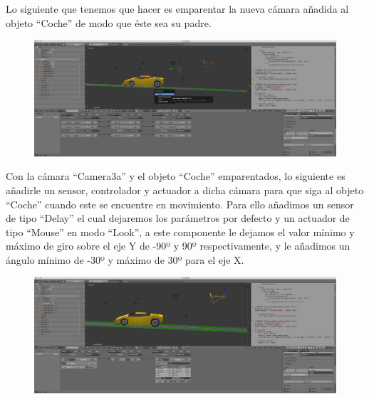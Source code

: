 \documentclass[10pt]{article}
\begin{document}
Lo siguiente que tenemos que hacer es emparentar la nueva cámara añadida al objeto ``Coche'' de modo 	que éste sea su padre.\\

\begin{figure}[H]
	\begin{center}
	 		\includegraphics[width = 1.00\textwidth]{Imagenes/p4-img14}
	\end{center} 
\end{figure}

Con la cámara ``Camera3a'' y el objeto ``Coche'' emparentados, lo siguiente es añadirle un sensor, controlador y actuador a dicha cámara para que siga al objeto ``Coche'' cuando este se encuentre en movimiento. Para ello añadimos un sensor de tipo ``Delay'' el cual dejaremos los parámetros por defecto y un actuador de tipo ``Mouse'' en modo ``Look'', a este componente le dejamos el valor mínimo y máximo de giro sobre el eje Y de -90º y 90º respectivamente, y le añadimos un ángulo mínimo de -30º y máximo de 30º para el eje X. \\

\begin{figure}[H]
	\begin{center}
	 		\includegraphics[width = 1.00\textwidth]{Imagenes/p4-img15}
	\end{center} 
\end{figure}
\end{document}
